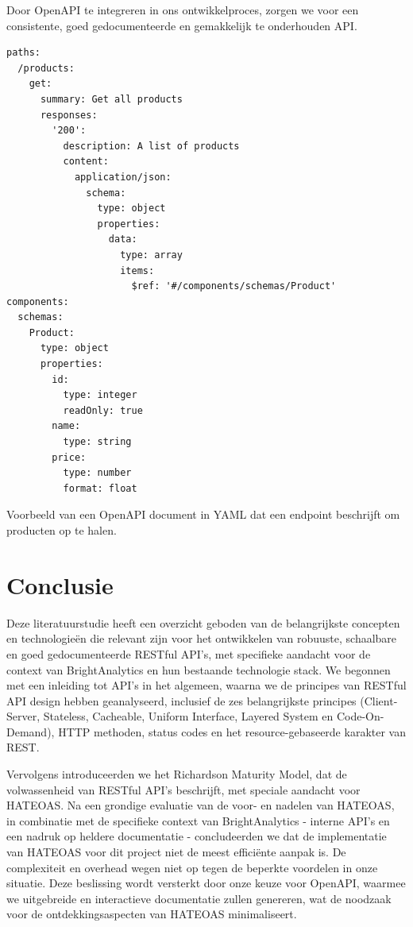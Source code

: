 Door OpenAPI te integreren in ons ontwikkelproces, zorgen we voor een consistente, goed gedocumenteerde en gemakkelijk te onderhouden API.

\begin{listing}[H]
\begin{verbatim}
paths:
  /products:
    get:
      summary: Get all products
      responses:
        '200':
          description: A list of products
          content:
            application/json:
              schema:
                type: object
                properties:
                  data:
                    type: array
                    items:
                      $ref: '#/components/schemas/Product'
components:
  schemas:
    Product:
      type: object
      properties:
        id:
          type: integer
          readOnly: true
        name:
          type: string
        price:
          type: number
          format: float
\end{verbatim}
\caption[Voorbeeld van een OpenAPI document in YAML]{Voorbeeld van een OpenAPI document in YAML dat een endpoint beschrijft om producten op te halen.}
\label{lst:openapi_example_resource}
\end{listing}

\section{Conclusie}

Deze literatuurstudie heeft een overzicht geboden van de belangrijkste concepten en technologieën die relevant zijn voor het ontwikkelen van robuuste, schaalbare en goed gedocumenteerde RESTful API's, met specifieke aandacht voor de context van BrightAnalytics en hun bestaande technologie stack. We begonnen met een inleiding tot API's in het algemeen, waarna we de principes van RESTful API design hebben geanalyseerd, inclusief de zes belangrijkste principes (Client-Server, Stateless, Cacheable, Uniform Interface, Layered System en Code-On-Demand), HTTP methoden, status codes en het resource-gebaseerde karakter van REST.

\bigskip

Vervolgens introduceerden we het Richardson Maturity Model, dat de volwassenheid van RESTful API's beschrijft, met speciale aandacht voor HATEOAS. Na een grondige evaluatie van de voor- en nadelen van HATEOAS, in combinatie met de specifieke context van BrightAnalytics - interne API's en een nadruk op heldere documentatie - concludeerden we dat de implementatie van HATEOAS voor dit project niet de meest efficiënte aanpak is. De complexiteit en overhead wegen niet op tegen de beperkte voordelen in onze situatie. Deze beslissing wordt versterkt door onze keuze voor OpenAPI, waarmee we uitgebreide en interactieve documentatie zullen genereren, wat de noodzaak voor de ontdekkingsaspecten van HATEOAS minimaliseert.

